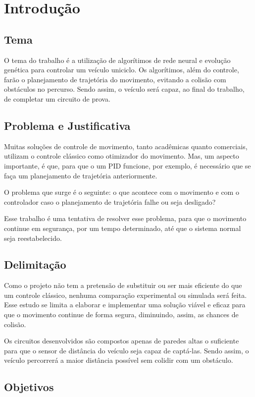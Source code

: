 \chapter{Introdução}\label{ch1}

\section{Tema}
O tema do trabalho é a utilização de algorítimos de rede neural e evolução genética para controlar um veículo uniciclo. Os algorítimos, além do controle, farão o planejamento de trajetória do movimento, evitando a colisão com obstáculos no percurso. Sendo assim, o veículo será capaz, ao final do trabalho, de completar um circuito de prova.

\section{Problema e Justificativa}
Muitas soluções de controle de movimento, tanto acadêmicas quanto comerciais, utilizam o controle clássico como otimizador do movimento. Mas, um aspecto importante, é que, para que o um PID funcione, por exemplo, é necessário que se faça um planejamento de trajetória anteriormente.

O problema que surge é o seguinte: o que acontece com o movimento e com o controlador caso o planejamento de trajetória falhe ou seja desligado?

Esse trabalho é uma tentativa de resolver esse problema, para que o movimento continue em segurança, por um tempo determinado, até que o sistema normal seja reestabelecido.

\section{Delimitação}
Como o projeto não tem a pretensão de substituir ou ser mais eficiente do que um controle clássico, nenhuma comparação experimental ou simulada será feita. Esse estudo se limita a elaborar e implementar uma solução viável e eficaz para que o movimento continue de forma segura, diminuindo, assim, as chances de colisão.

Os circuitos desenvolvidos são compostos apenas de paredes altas o suficiente para que o sensor de distância do veículo seja capaz de captá-las. Sendo assim, o veículo percorrerá a maior distância possível sem colidir com um obstáculo.

\section{Objetivos}
